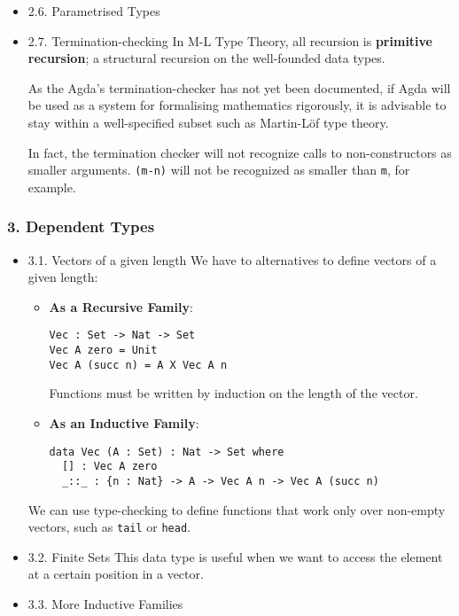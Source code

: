 \documentclass[11pt]{article}
\begin{document}
\begin{itemize}
\item 2.6. Parametrised Types
\label{sec-1-1-2-6}
\item 2.7. Termination-checking
\label{sec-1-1-2-7}
In M-L Type Theory, all recursion is \textbf{primitive recursion}; a structural
recursion on the well-founded data types.

As the Agda's termination-checker has not yet been documented, if Agda will
be used as a system for formalising mathematics rigorously, it is advisable to
stay within a well-specified subset such as Martin-Löf type theory.

In fact, the termination checker will not recognize calls to non-constructors
as smaller arguments. \texttt{(m-n)} will not be recognized as smaller than \texttt{m},
for example.
\end{itemize}

\subsubsection*{3. Dependent Types}
\label{sec-1-1-3}
\begin{itemize}
\item 3.1. Vectors of a given length
\label{sec-1-1-3-1}
We have to alternatives to define vectors of a given length:

\begin{itemize}
\item \textbf{As a Recursive Family}:

\begin{verbatim}
Vec : Set -> Nat -> Set
Vec A zero = Unit
Vec A (succ n) = A X Vec A n
\end{verbatim}

Functions must be written by induction on the length of the vector.

\item \textbf{As an Inductive Family}:

\begin{verbatim}
data Vec (A : Set) : Nat -> Set where
  [] : Vec A zero
  _::_ : {n : Nat} -> A -> Vec A n -> Vec A (succ n)
\end{verbatim}
\end{itemize}

We can use type-checking to define functions that work only over non-empty
vectors, such as \texttt{tail} or \texttt{head}.

\item 3.2. Finite Sets
\label{sec-1-1-3-2}
This data type is useful when we want to access the element at a certain
position in a vector.

\item 3.3. More Inductive Families
\label{sec-1-1-3-3}
\end{itemize}
\end{document}
